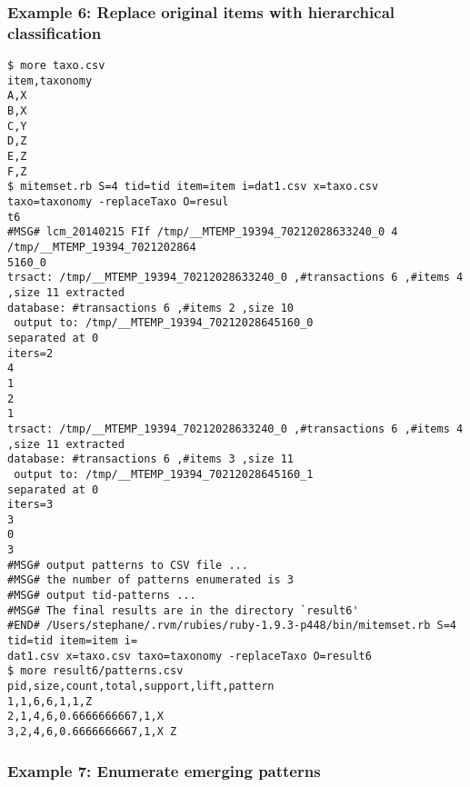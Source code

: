 \subsubsection*{Example 6: Replace original items with hierarchical classification}



\begin{Verbatim}[baselinestretch=0.7,frame=single]
$ more taxo.csv
item,taxonomy
A,X
B,X
C,Y
D,Z
E,Z
F,Z
$ mitemset.rb S=4 tid=tid item=item i=dat1.csv x=taxo.csv taxo=taxonomy -replaceTaxo O=resul
t6
#MSG# lcm_20140215 FIf /tmp/__MTEMP_19394_70212028633240_0 4 /tmp/__MTEMP_19394_7021202864
5160_0
trsact: /tmp/__MTEMP_19394_70212028633240_0 ,#transactions 6 ,#items 4 ,size 11 extracted 
database: #transactions 6 ,#items 2 ,size 10
 output to: /tmp/__MTEMP_19394_70212028645160_0
separated at 0
iters=2
4
1
2
1
trsact: /tmp/__MTEMP_19394_70212028633240_0 ,#transactions 6 ,#items 4 ,size 11 extracted 
database: #transactions 6 ,#items 3 ,size 11
 output to: /tmp/__MTEMP_19394_70212028645160_1
separated at 0
iters=3
3
0
3
#MSG# output patterns to CSV file ...
#MSG# the number of patterns enumerated is 3
#MSG# output tid-patterns ...
#MSG# The final results are in the directory `result6'
#END# /Users/stephane/.rvm/rubies/ruby-1.9.3-p448/bin/mitemset.rb S=4 tid=tid item=item i=
dat1.csv x=taxo.csv taxo=taxonomy -replaceTaxo O=result6
$ more result6/patterns.csv
pid,size,count,total,support,lift,pattern
1,1,6,6,1,1,Z
2,1,4,6,0.6666666667,1,X
3,2,4,6,0.6666666667,1,X Z
\end{Verbatim}
\subsubsection*{Example 7: Enumerate emerging patterns}



